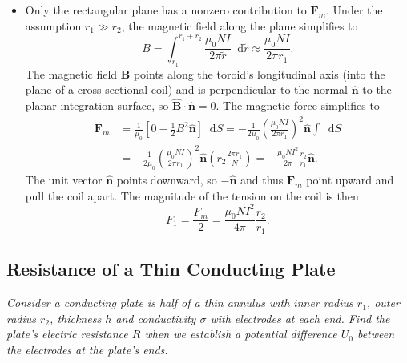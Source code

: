 \documentclass[11pt, a4paper]{article}
\newcommand{\diff}{\mathop{}\!\mathrm{d}} %
\renewcommand{\vec}[1]{\bm{#1}} %
\newcommand{\uvec}[1]{\hat{\vec{#1}}} %
\begin{document}
\begin{itemize}
	\item Only the rectangular plane has a nonzero contribution to $ \vec{F}_{m} $. Under the assumption $ r_{1} \gg r_{2} $, the magnetic field along the plane simplifies to
	\begin{equation*}
		B = \int_{r_{1}}^{r_{1} + r_{2}} \frac{\mu_{0}NI}{2\pi \tilde{r}} \diff \tilde{r} \approx \frac{\mu_{0}NI}{2\pi r_{1}}.
	\end{equation*}
	The magnetic field $ \vec{B} $ points along the toroid's longitudinal axis (into the plane of a cross-sectional coil) and is perpendicular to the normal $ \uvec{n} $ to the planar integration surface, so $ \uvec{B} \cdot \uvec{n} = 0 $. The magnetic force simplifies to
	\begin{align*}
		\vec{F}_{m} &= \frac{1}{\mu_{0}}\left [0 - \frac{1}{2}B^{2}\uvec{n}\right ] \diff S = - \frac{1}{2\mu_{0}} \left(\frac{\mu_{0}NI}{2\pi r_{1}}\right)^{2} \uvec{n} \int \diff S \\
		&= - \frac{1}{2\mu_{0}} \left(\frac{\mu_{0}NI}{2\pi r_{1}}\right)^{2} \uvec{n} \left (r_{2} \frac{2\pi r_{1}}{N}\right ) = - \frac{\mu_{0}NI^{2}}{2\pi}\frac{r_{2}}{r_{1}} \uvec{n}.
	\end{align*}
	The unit vector $ \uvec{n} $ points downward, so $ -\uvec{n} $ and thus $ \vec{F}_{m} $ point upward and pull the coil apart. The magnitude of the tension on the coil is then
	\begin{equation*}
		F_{1} = \frac{F_{m}}{2} =  \frac{\mu_{0}NI^{2}}{4\pi}\frac{r_{2}}{r_{1}}.
	\end{equation*}
	
\end{itemize}

\subsection{Resistance of a Thin Conducting Plate}
\textit{Consider a conducting plate is half of a thin annulus with inner radius $ r_{1} $, outer radius $ r_{2} $, thickness $ h $ and conductivity $ \sigma $ with electrodes at each end.  Find the plate's electric resistance $ R $ when we establish a potential difference $ U_{0}$ between the electrodes at the plate's ends.}
\end{document}
